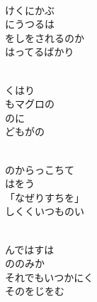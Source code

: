 \documentclass[10pt,b5j]{tarticle} %
\begin{document}
\begin{enumerate}
\begin{minipage}[c]{\blocksize}
    \end{minipage}
    \begin{minipage}[c]{\blocksize}

        \vspace{\linespace}
        \item~\\
        けくにかぶ\\
        にうつるは\\
        をしをされるのか\\
        はってるばかり
        
        \vspace{\linespace}
        \item~\\
        くはり\\
        もマグロの\\
        のに\\
        どもがの
        
        \vspace{\linespace}
        \item~\\
        のからっこちて\\
        はをう\\
        「なぜりすちを」\\
        しくくいつものい
        
        \vspace{\linespace}
        \item~\\
        んではすは\\
        ののみか\\
        それでもいつかにく\\
        そのをじをむ
        

\end{minipage}
\end{enumerate}
\end{document}

